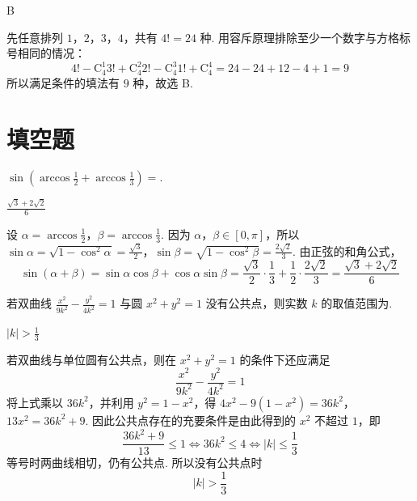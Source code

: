 \documentclass[UTF8,a4paper,oneside,11pt]{ctexbook}
\begin{document}
\begin{answer}
B
\end{answer}

\begin{solution}
先任意排列 \(1\)，\(2\)，\(3\)，\(4\)，共有 \(4!=24\) 种. 用容斥原理排除至少一个数字与方格标号相同的情况：
\[
4!-\mathrm C_4^1 3!+\mathrm C_4^2 2!-\mathrm C_4^3 1!+\mathrm C_4^4
=24-24+12-4+1=9
\]
所以满足条件的填法有 \(9\) 种，故选 B.
\end{solution}

\section{填空题}

\begin{problem}
\(\sin\left(\arccos\frac{1}{2}+\arccos\frac{1}{3}\right)=\)\fillinblank{}.
\end{problem}

\begin{answer}
\(\frac{\sqrt{3}+2\sqrt{2}}{6}\)
\end{answer}

\begin{solution}
设
\(\alpha=\arccos\frac12\)，\(\beta=\arccos\frac13\).
因为 \(\alpha\)，\(\beta\in[0,\pi]\)，所以
\(\sin\alpha=\sqrt{1-\cos^2\alpha}=\frac{\sqrt3}{2}\)，\(\sin\beta=\sqrt{1-\cos^2\beta}=\frac{2\sqrt2}{3}\).
由正弦的和角公式，
\[
\sin(\alpha+\beta)
=\sin\alpha\cos\beta+\cos\alpha\sin\beta
=\frac{\sqrt3}{2}\cdot\frac13+\frac12\cdot\frac{2\sqrt2}{3}
=\frac{\sqrt3+2\sqrt2}{6}
\]
\end{solution}

\begin{problem}
若双曲线 \(\frac{x^2}{9k^2}-\frac{y^2}{4k^2}=1\) 与圆 \(x^2+y^2=1\) 没有公共点，则实数 \(k\) 的取值范围为\fillinblank{}.
\end{problem}

\begin{answer}
\(\left|k\right|>\frac{1}{3}\)
\end{answer}

\begin{solution}
若双曲线与单位圆有公共点，则在 \(x^2+y^2=1\) 的条件下还应满足
\[
\frac{x^2}{9k^2}-\frac{y^2}{4k^2}=1
\]
将上式乘以 \(36k^2\)，并利用 \(y^2=1-x^2\)，得
\(4x^2-9(1-x^2)=36k^2\)，\(13x^2=36k^2+9\).
因此公共点存在的充要条件是由此得到的 \(x^2\) 不超过 \(1\)，即
\[
\frac{36k^2+9}{13}\leq1
\Longleftrightarrow
36k^2\leq4
\Longleftrightarrow
|k|\leq\frac13
\]
等号时两曲线相切，仍有公共点. 所以没有公共点时
\[
|k|>\frac13
\]
\end{solution}
\end{document}
